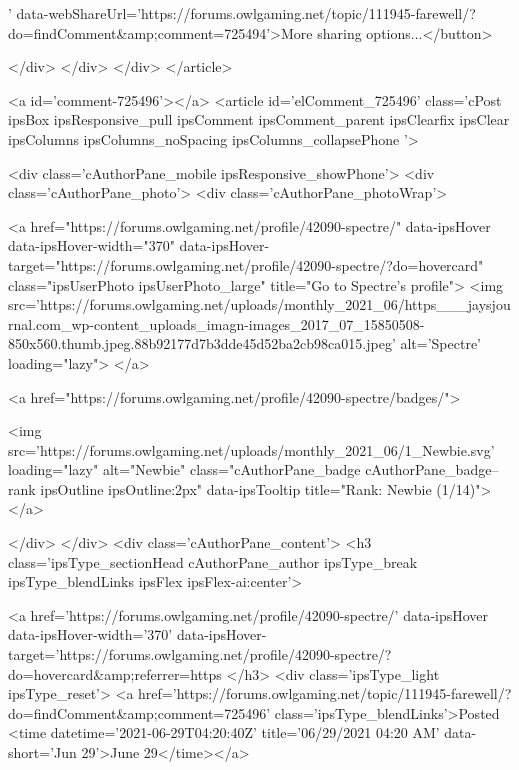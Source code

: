' data-webShareUrl='https://forums.owlgaming.net/topic/111945-farewell/?do=findComment&amp;comment=725494'>More sharing options...</button>

	
</div>
</div>
	</div>
</article>
					
				
					
					
					



<a id='comment-725496'></a>
<article  id='elComment_725496' class='cPost ipsBox ipsResponsive_pull  ipsComment  ipsComment_parent ipsClearfix ipsClear ipsColumns ipsColumns_noSpacing ipsColumns_collapsePhone    '>
	

	

	<div class='cAuthorPane_mobile ipsResponsive_showPhone'>
		<div class='cAuthorPane_photo'>
			<div class='cAuthorPane_photoWrap'>
				


	<a href="https://forums.owlgaming.net/profile/42090-spectre/" data-ipsHover data-ipsHover-width="370" data-ipsHover-target="https://forums.owlgaming.net/profile/42090-spectre/?do=hovercard" class="ipsUserPhoto ipsUserPhoto_large" title="Go to Spectre's profile">
		<img src='https://forums.owlgaming.net/uploads/monthly_2021_06/https___jaysjournal.com_wp-content_uploads_imagn-images_2017_07_15850508-850x560.thumb.jpeg.88b92177d7b3dde45d52ba2cb98ca015.jpeg' alt='Spectre' loading="lazy">
	</a>

				
				
					<a href="https://forums.owlgaming.net/profile/42090-spectre/badges/">
						
<img src='https://forums.owlgaming.net/uploads/monthly_2021_06/1_Newbie.svg' loading="lazy" alt="Newbie" class="cAuthorPane_badge cAuthorPane_badge--rank ipsOutline ipsOutline:2px" data-ipsTooltip title="Rank: Newbie (1/14)">
					</a>
				
			</div>
		</div>
		<div class='cAuthorPane_content'>
			<h3 class='ipsType_sectionHead cAuthorPane_author ipsType_break ipsType_blendLinks ipsFlex ipsFlex-ai:center'>
				


<a href='https://forums.owlgaming.net/profile/42090-spectre/' data-ipsHover data-ipsHover-width='370' data-ipsHover-target='https://forums.owlgaming.net/profile/42090-spectre/?do=hovercard&amp;referrer=https%
			</h3>
			<div class='ipsType_light ipsType_reset'>
				<a href='https://forums.owlgaming.net/topic/111945-farewell/?do=findComment&amp;comment=725496' class='ipsType_blendLinks'>Posted <time datetime='2021-06-29T04:20:40Z' title='06/29/2021 04:20  AM' data-short='Jun 29'>June 29</time></a>
				
